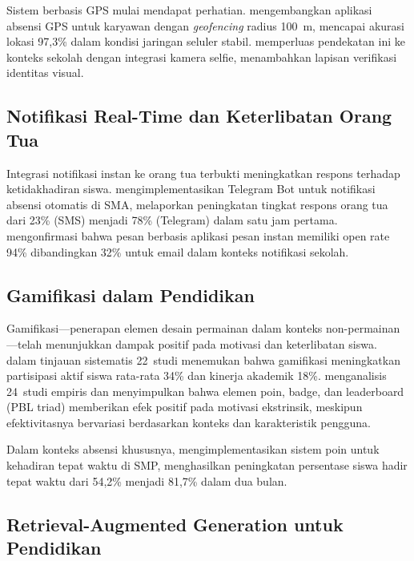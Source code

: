 \documentclass[12pt,a4paper]{article}
\begin{document}
Sistem berbasis GPS mulai mendapat perhatian.
\citet{hidayat2023gps} mengembangkan aplikasi absensi GPS untuk
karyawan dengan \textit{geofencing} radius 100~m, mencapai akurasi
lokasi 97,3\% dalam kondisi jaringan seluler stabil.
\citet{mahardika2024mobile} memperluas pendekatan ini ke konteks
sekolah dengan integrasi kamera selfie, menambahkan lapisan verifikasi
identitas visual.

\subsection{Notifikasi Real-Time dan Keterlibatan Orang Tua}

Integrasi notifikasi instan ke orang tua terbukti meningkatkan respons
terhadap ketidakhadiran siswa.
\citet{nugraha2022telegram} mengimplementasikan Telegram Bot untuk
notifikasi absensi otomatis di SMA, melaporkan peningkatan tingkat
respons orang tua dari 23\% (SMS) menjadi 78\% (Telegram) dalam
satu jam pertama.
\citet{prasetyo2023notifikasi} mengonfirmasi bahwa pesan berbasis
aplikasi pesan instan memiliki open rate 94\% dibandingkan 32\% untuk
email dalam konteks notifikasi sekolah.

\subsection{Gamifikasi dalam Pendidikan}

Gamifikasi---penerapan elemen desain permainan dalam konteks non-permainan
\citep{deterding2011game}---telah menunjukkan dampak positif pada
motivasi dan keterlibatan siswa.
\citet{dichev2017gamifying} dalam tinjauan sistematis 22~studi
menemukan bahwa gamifikasi meningkatkan partisipasi aktif siswa
rata-rata 34\% dan kinerja akademik 18\%.
\citet{hamari2014does} menganalisis 24~studi empiris dan menyimpulkan
bahwa elemen poin, badge, dan leaderboard (PBL triad) memberikan efek
positif pada motivasi ekstrinsik, meskipun efektivitasnya bervariasi
berdasarkan konteks dan karakteristik pengguna.

Dalam konteks absensi khususnya, \citet{kusuma2023gamifikasi}
mengimplementasikan sistem poin untuk kehadiran tepat waktu di SMP,
menghasilkan peningkatan persentase siswa hadir tepat waktu dari
54,2\% menjadi 81,7\% dalam dua bulan.

\subsection{Retrieval-Augmented Generation untuk Pendidikan}
\end{document}
